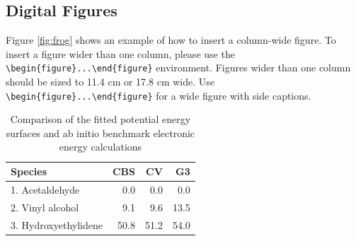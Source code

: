 \documentclass[9pt,twocolumn,twoside]{pnas-new}
\begin{document}
\subsection*{Digital Figures}
\label{sec:figures}



Figure \ref{fig:frog} shows an example of how to insert a column-wide figure. To insert a figure wider than one column, please use the \verb|\begin{figure}...\end{figure}| environment. Figures wider than one column should be sized to 11.4 cm or 17.8 cm wide. Use \verb|\begin{figure}...\end{figure}| for a wide figure with side captions.


\begin{table}%
\centering
\caption{Comparison of the fitted potential energy surfaces and ab initio benchmark electronic energy calculations}
\begin{tabular}{lrrr}
Species & CBS & CV & G3 \\
\midrule
1. Acetaldehyde & 0.0 & 0.0 & 0.0 \\
2. Vinyl alcohol & 9.1 & 9.6 & 13.5 \\
3. Hydroxyethylidene & 50.8 & 51.2 & 54.0\\
\bottomrule
\end{tabular}

\end{table}
\end{document}
